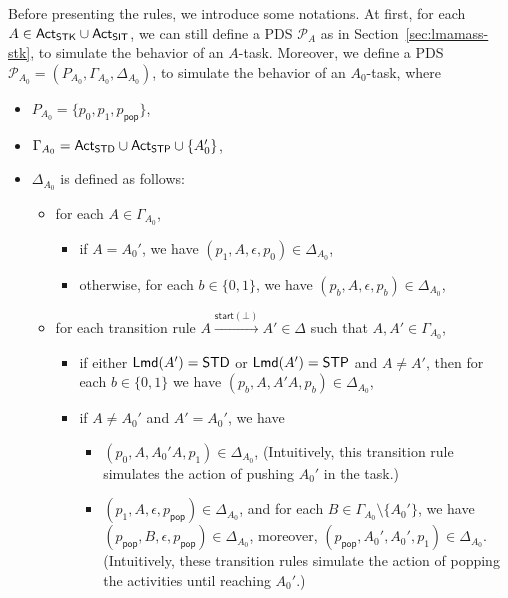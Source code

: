 \documentclass[preprint,12pt]{elsarticle}
\newcommand\Mm{{\mathcal{M} }}
\newcommand\Pp{{\mathcal{P} }}
\newcommand\act{{\sf Act}}
\newcommand\lmd{{\sf Lmd}}
\newcommand\standard{{\sf STD}}
\newcommand\singletop{{\sf STP}}
\newcommand\singletask{{\sf STK}}
\newcommand\singleinstance{{\sf SIT}}
\newcommand\startactivity{{\mathsf{start} }}
\newcommand{\STD}{\mathsf{STD}}
\newcommand{\STP}{\mathsf{STP}}
\newcommand{\PDS}{\textsf{PDS}}
\newcommand\pop{\mathsf{pop}}
\begin{document}
Before presenting the rules, we introduce some notations. At first, for each $A \in \act_\singletask \cup \act_\singleinstance$, we can still define a {\PDS} $\Pp_A$ as in Section~\ref{sec:lmamass-stk}, to simulate the behavior of an $A$-task. 
Moreover, we define a {\PDS} $\Pp_{A_0}=(P_{A_0}, \Gamma_{A_0},\Delta_{A_0})$, to simulate the behavior of an $A_0$-task,  where
\begin{itemize}
    \item $P_{A_0} = \{p_0,p_1,p_{\pop}\}$,
    \item $\Gamma_{A_0} = \act_\standard \cup \act_\singletop \cup \{A_0'\}$,
    \item $\Delta_{A_0}$ is defined as follows:
    \begin{itemize}
        \item for each $A\in\Gamma_{A_0}$, 
            \begin{itemize}
                \item if $A=A_0'$, we have $(p_1,A,\epsilon,p_0)\in\Delta_{A_0}$,
                \item otherwise, for each $b\in\{0,1\}$, we have $(p_b,A,\epsilon,p_b)\in\Delta_{A_0}$, 
            \end{itemize}
        \item for each transition rule $A\xrightarrow{\startactivity(\bot)}A' \in \Delta$ such that $A, A' \in \Gamma_{A_0}$,
        \begin{itemize}
            \item if either $\lmd(A') = \STD$ or $\lmd(A')=\STP$ and $A\neq A'$, then for each $b\in\{0,1\}$ we have $(p_b,A,A'A,p_b)\in\Delta_{A_0}$,
            \item if $A\neq A_0'$ and $A'=A_0'$, we have 
            \begin{itemize}
                \item $(p_0, A, A_0'A, p_1) \in \Delta_{A_0}$, (Intuitively, this transition rule simulates the action of pushing $A_0'$ in the task.)
                \item $(p_1, A, \epsilon, p_{\pop}) \in \Delta_{A_0}$, and for each $B\in\Gamma_{A_0}\setminus\{A_0'\}$, we have $(p_{\pop},B,\epsilon,p_{\pop})\in\Delta_{A_0}$, moreover, $(p_{\pop},A_0',A_0',p_1)\in\Delta_{A_0}$. (Intuitively, these transition rules simulate the action of popping the activities until reaching $A_0'$.)
            \end{itemize}
        \end{itemize}
    \end{itemize}
\end{itemize}
\end{document}
